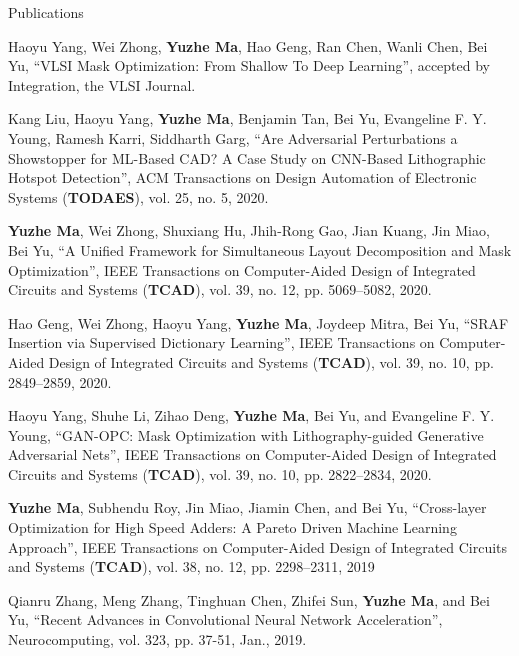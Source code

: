\begin{rSection}{Publications}
\begin{description}[font=\normalfont]
\item[{[J9]}]{
        Haoyu Yang, Wei Zhong, \textbf{Yuzhe Ma}, Hao Geng, Ran Chen, Wanli Chen, Bei Yu,
        ``VLSI Mask Optimization: From Shallow To Deep Learning'',
        accepted by Integration, the VLSI Journal.
    }

\item[{[J8]}]{
        Kang Liu, Haoyu Yang, \textbf{Yuzhe Ma}, Benjamin Tan, Bei Yu, Evangeline F. Y. Young, Ramesh Karri, Siddharth Garg,
        ``Are Adversarial Perturbations a Showstopper for ML-Based CAD? A Case Study on CNN-Based Lithographic Hotspot Detection'',
        ACM Transactions on Design Automation of Electronic Systems (\textbf{TODAES}), vol. 25, no. 5, 2020.
}


\item[{[J7]}]{
        \textbf{Yuzhe Ma}, Wei Zhong, Shuxiang Hu, Jhih-Rong Gao, Jian Kuang, Jin Miao, Bei Yu,
        ``A Unified Framework for Simultaneous Layout Decomposition and Mask Optimization'',
        IEEE Transactions on Computer-Aided Design of Integrated Circuits and Systems (\textbf{TCAD}), vol. 39, no. 12, pp. 5069--5082, 2020.
}

\item[{[J6]}]{
     Hao Geng, Wei Zhong, Haoyu Yang, \textbf{Yuzhe Ma}, Joydeep Mitra, Bei Yu,
        ``SRAF Insertion via Supervised Dictionary Learning'',
        IEEE Transactions on Computer-Aided Design of Integrated Circuits and Systems (\textbf{TCAD}), vol. 39, no. 10, pp. 2849--2859, 2020.
}

\item[{[J5]}]{
    Haoyu Yang, Shuhe Li, Zihao Deng, \textbf{Yuzhe Ma}, Bei Yu, and Evangeline F. Y. Young,
    ``GAN-OPC: Mask Optimization with Lithography-guided Generative Adversarial Nets'',
     IEEE Transactions on Computer-Aided Design of Integrated Circuits and Systems (\textbf{TCAD}), vol. 39, no. 10, pp. 2822--2834, 2020.
}

\item[{[J4]}]{
	\textbf{Yuzhe Ma}, Subhendu Roy, Jin Miao, Jiamin Chen, and Bei Yu,
	``Cross-layer Optimization for High Speed Adders: A Pareto Driven Machine Learning Approach'',
    IEEE Transactions on Computer-Aided Design of Integrated Circuits and Systems (\textbf{TCAD}), vol. 38, no. 12, pp. 2298--2311, 2019
}

\item[{[J3]}]{
	Qianru Zhang, Meng Zhang, Tinghuan Chen, Zhifei Sun, \textbf{Yuzhe Ma}, and Bei Yu,
	``Recent Advances in Convolutional Neural Network Acceleration'',
	Neurocomputing, vol. 323, pp. 37-51, Jan., 2019.
}


\end{description}
\end{rSection}
